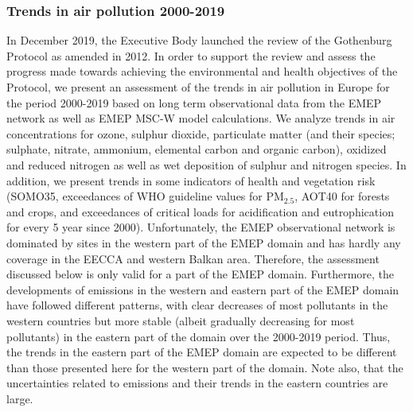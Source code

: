 

\subsubsection*{Trends in air pollution 2000-2019}
In December 2019, the Executive Body launched the review of the Gothenburg Protocol as amended in 2012. In order to support the review and assess the progress made towards achieving the environmental and health objectives of the Protocol, we present an assessment of the trends in air pollution in Europe for the period 2000-2019 based on long term observational data from the EMEP network as well as EMEP MSC-W model calculations.
We analyze trends in air concentrations for ozone, sulphur dioxide, particulate matter (and their species; sulphate, nitrate, ammonium, elemental carbon and organic carbon), oxidized and reduced nitrogen as well as wet deposition of sulphur and nitrogen species. In addition, we present trends in some indicators of health and vegetation risk (SOMO35, exceedances of WHO guideline values for PM$_{2.5}$, AOT40 for forests and crops, and exceedances of critical loads for acidification and eutrophication for every 5 year since 2000).
Unfortunately, the EMEP observational network is dominated by sites in the western part of the EMEP domain and has hardly any coverage in the EECCA and western Balkan area. Therefore, the assessment discussed below is only valid for a part of the EMEP domain. Furthermore, the developments of emissions in the western and eastern part of the EMEP domain have followed different patterns, with clear decreases of most pollutants in the western countries but more stable (albeit gradually decreasing for most pollutants) in the eastern part of the domain over the 2000-2019 period. Thus, the trends in the eastern part of the EMEP domain are expected to be different than those presented here for the western part of the domain. Note also, that the uncertainties related to emissions and their trends in the eastern countries are large.

